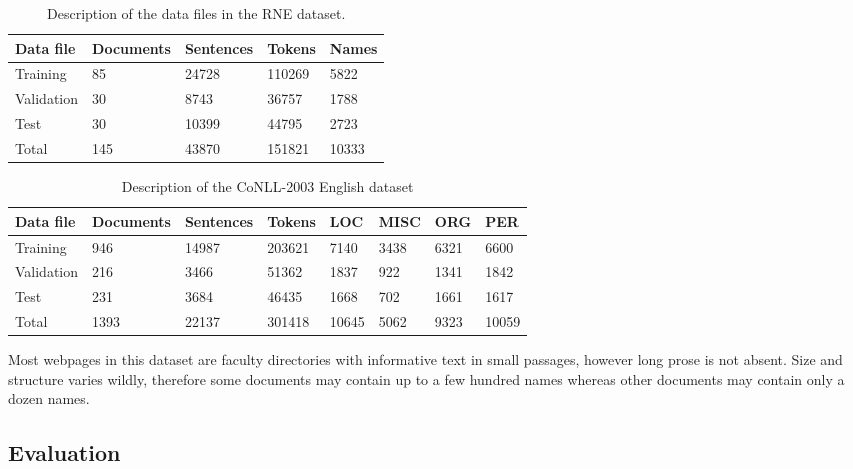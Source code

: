 \documentclass{nle}
\begin{document}
\begin{table}[h]
  \small
  \begin{center}
    \begin{tabular}{ lllll }
      \toprule
      Data file & Documents & Sentences & Tokens & Names \\
      \midrule
      Training    & 85  & 24728 & 110269 & 5822  \\  
      Validation  & 30  & 8743  & 36757  & 1788  \\
      Test        & 30  & 10399 & 44795  & 2723  \\
      \midrule
      Total       & 145 & 43870 & 151821 & 10333 \\
      \bottomrule
    \end{tabular}
  \end{center}
  \caption{Description of the data files in the RNE dataset.}
  \label{tab:dataset}
\end{table}

\begin{table}[h]
  \small
  \begin{center}
    \begin{tabular}{ llllllll }
      \toprule
      Data file & Documents & Sentences & Tokens & LOC & MISC & ORG & PER \\
      \midrule
      Training    & 946  & 14987 & 203621 & 7140 & 3438 & 6321 & 6600 \\  
      Validation  & 216  & 3466  & 51362 & 1837 & 922 & 1341 & 1842  \\
      Test        & 231  & 3684  & 46435 & 1668 & 702 & 1661 & 1617  \\
      \midrule
      Total       & 1393 & 22137 & 301418 & 10645 & 5062 & 9323 & 10059 \\
      \bottomrule
    \end{tabular}
  \end{center}
  \caption{Description of the {CoNLL-2003} English dataset}
  \label{tab:conll}
\end{table}


Most webpages in this dataset are faculty directories with informative
text in small passages, however long prose is not absent. 
Size and structure varies wildly, therefore some documents 
may contain up to a few hundred names whereas other documents may contain 
only a dozen names. 

\subsection{Evaluation}
\label{sec:evaluation}
\end{document}
